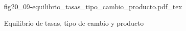 \begin{figure}[h]
\centering
\def\svgwidth{0.9\textwidth}
{fig20_09-equilibrio_tasas_tipo_cambio_producto.pdf_tex}
\caption{Equilibrio de tasas, tipo de cambio y producto}
\label{fig20_09-equilibrio_tasas_tipo_cambio_producto}
\end{figure}